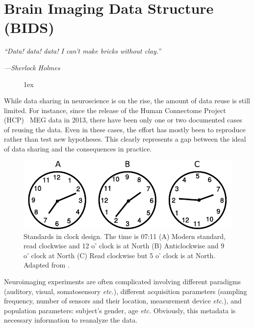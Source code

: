 \chapter{Brain Imaging Data Structure (BIDS)}
\label{chapter:bids}

\epigraph{\small\itshape ``Data! data! data! I can't make bricks without clay.''}
{\small\textit{---Sherlock Holmes}}

\begin{figure}[ht!]
\centering
\begingroup
\etocstandardlines
\renewcommand{\etocbelowtocskip}{0pt\relax}
\fboxsep1ex
\localtableofcontents
\endgroup
\end{figure}

\clearpage

While data sharing in neuroscience is on the rise, the amount of data reuse is still limited. For instance, since the release of the Human Connectome Project (HCP)~\citep{larson2013adding} MEG data in 2013, there have been only one or two documented cases~\citep{jas2017autoreject} of reusing the data. Even in these cases, the effort has mostly been to reproduce rather than test new hypotheses. This clearly represents a gap between the ideal of data sharing and the consequences in practice. 


\begin{figure}[htb]
\begin{center}
   \includegraphics[width=0.7\linewidth]{figures/clock.pdf}
\end{center}
   \caption[Standards in clocks]{Standards in clock design. The time is 07:11 (A) Modern standard, read clockwise and 12 o' clock is at North (B) Anticlockwise and 9 o' clock at North (C) Read clockwise but 5 o' clock is at North. Adapted from \cite{norman2013design}.}
   \label{fig:clock_standards}
\end{figure}
Neuroimaging experiments are often complicated involving different paradigms (auditory, visual, somatosensory \emph{etc.}), different acquisition parameters (sampling frequency, number of sensors and their location, measurement device \emph{etc.}), and population parameters: subject's gender, age \emph{etc.} Obviously, this metadata is necessary information to reanalyze the data.   

